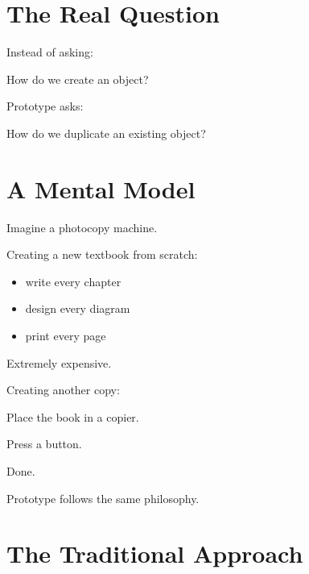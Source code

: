 \documentclass[11pt,a4paper]{book}
\begin{document}
\section{The Real Question}

\begin{idea}

Instead of asking:

\begin{center}
How do we create an object?
\end{center}

Prototype asks:

\begin{center}
How do we duplicate an existing object?
\end{center}

\end{idea}


\section{A Mental Model}

\begin{mentalmodel}

Imagine a photocopy machine.

Creating a new textbook from scratch:

\begin{itemize}

\item write every chapter
\item design every diagram
\item print every page
\end{itemize}

Extremely expensive.

Creating another copy:

Place the book in a copier.

Press a button.

Done.

Prototype follows the same philosophy.

\end{mentalmodel}


\section{The Traditional Approach}
\end{document}
